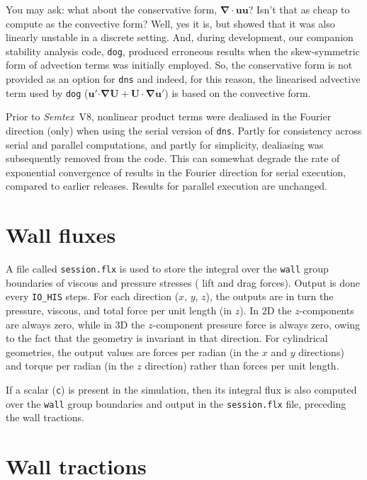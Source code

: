 \documentclass[11pt]{report}
\newcommand{\Semtex}{\emph{Semtex}} \newcommand{\Dog}{\emph{Dog}}
\begin{document}
You may ask: what about the conservative form, $\bm{\nabla\cdot uu}$?
Isn't that as cheap to compute as the convective form?  Well, yes it
is, but \citet{wikl01} showed that it was also linearly unstable in a
discrete setting.  And, during development, our companion stability
analysis code, \verb+dog+, produced erroneous results when the
skew-symmetric form of advection terms was initially employed.  So,
the conservative form is not provided as an option for \verb+dns+ and
indeed, for this reason, the linearised advective term used by
\verb+dog+ ($\bm{u}'\bm{\cdot\nabla U}+\bm{U\cdot\nabla u}'$) is based
on the convective form.

Prior to \Semtex~V8, nonlinear product terms were dealiased in the
Fourier direction (only) when using the serial version of \verb+dns+.
Partly for consistency across serial and parallel computations, and
partly for simplicity, dealiasing was subsequently removed from the
code.  This can somewhat degrade the rate of exponential convergence
of results in the Fourier direction for serial execution, compared to
earlier releases.  Results for parallel execution are unchanged.

\section{Wall fluxes}
\label{sec.flux}

A file called \verb+session.flx+ is used to store the integral over
the \verb+wall+ group boundaries of viscous and pressure stresses (\ie
lift and drag forces).  Output is done every \verb+IO_HIS+ steps.  For
each direction ($x$, $y$, $z$), the outputs are in turn the pressure,
viscous, and total force per unit length (in $z$).  In 2D the
$z$-components are always zero, while in 3D the $z$-component pressure
force is always zero, owing to the fact that the geometry is invariant
in that direction.  For cylindrical geometries, the output values are
forces per radian (in the $x$ and $y$ directions) and torque per
radian (in the $z$ direction) rather than forces per unit length.

If a scalar (\verb+c+) is present in the simulation, then its integral
flux is also computed over the \verb+wall+ group boundaries and output
in the \verb+session.flx+ file, preceding the wall tractions.

\section{Wall tractions}
\label{sec.traction}
\end{document}

